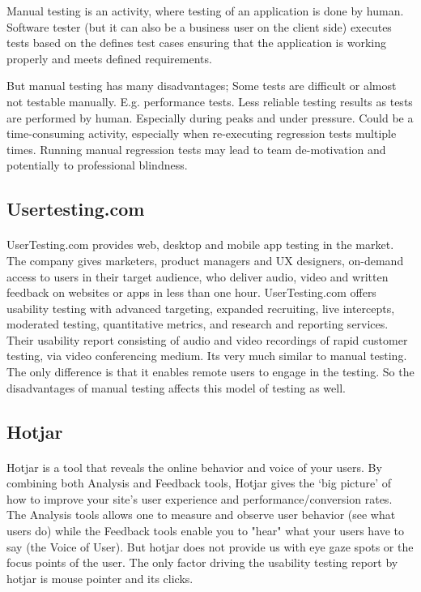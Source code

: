 \documentclass[12pt,a4paper,final]{extreport}
\begin{document}
Manual testing is an activity, where testing of an application is done by human. Software tester (but it can also be a business user on the client side) executes tests based on the defines test cases ensuring that the application is working properly and meets defined requirements.

But manual testing has many disadvantages; 
Some tests are difficult or almost not testable manually. E.g. performance tests.
Less reliable testing results as tests are performed by human. Especially during peaks and under pressure.
Could be a time-consuming activity, especially when re-executing regression tests multiple times.
Running manual regression tests may lead to team de-motivation and potentially to professional blindness.

\subsection{Usertesting.com}
\paragraph{}
UserTesting.com provides web, desktop and mobile app testing in the market. The company gives marketers, product managers and UX designers, on-demand access to users in their target audience, who deliver audio, video and written feedback on websites or apps in less than one hour. UserTesting.com offers usability testing with advanced targeting, expanded recruiting, live intercepts, moderated testing, quantitative metrics, and research and reporting services.
Their usability report consisting of audio and video recordings of rapid customer testing, via video conferencing medium. Its very much similar to manual testing. The only difference is that it enables remote users to engage in the testing. So the disadvantages of manual testing affects this model of testing as well.

\subsection{Hotjar}
\paragraph{}
Hotjar is a tool that reveals the online behavior and voice of your users. By combining both Analysis and Feedback tools, Hotjar gives the ‘big picture’ of how to improve your site's user experience and performance/conversion rates.
The Analysis tools allows one to measure and observe user behavior (see what users do) while the Feedback tools enable you to "hear" what your users have to say (the Voice of User).
But hotjar does not provide us with eye gaze spots or the focus points of the user. The only factor driving the usability testing report by hotjar is mouse pointer and its clicks.
\end{document}

